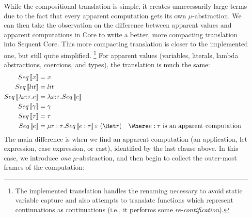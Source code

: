 \documentclass{article}
\begin{document}
While the compositional translation is simple, it creates unnecessarily large
terms due to the fact that every apparent computation gets its own
$\mu$-abstraction.  We can then take the observation on the difference between
apparent values and apparent computations in Core to write a better, more
compacting translation into Sequent Core.  This more compacting translation is
closer to the implemented one, but still quite simplified.%
\footnote{The implemented translation handles the renaming necessary to avoid
  static variable capture and also attempts to translate functions which
  represent continuations as continuations (i.e., it performs some
  \emph{re-contification}).}
For apparent values (variables, literals, lambda abstractions, coercions, and
types), the translation is much the same:
\begin{align*}
  Seq\trans{x} &= x
  \\
  Seq\trans{\lit} &= \lit
  \\
  Seq\trans{\fn{\ann{x}{\ty}} \expr}
  &=
  \fn{\ann{x}{\ty}} Seq\trans{\expr}
  \\
  Seq\trans{\cn} &= \cn
  \\
  Seq\trans{\ty} &= \ty
  \\
  Seq\trans{\expr}
  &= \comp{r:\ty} Seq\trans{\expr : \ty} \mt ~ (\ret r)
  &
  \Where
  \expr &:\ty \text{ is an apparent computation}
\end{align*}
The main difference is when we find an apparent computation (an application, let
expression, case expression, or cast), identified by the last clause above.  In
this case, we introduce \emph{one} $\mu$-abstraction, and then begin to collect
the outer-most frames of the computation:
\end{document}
